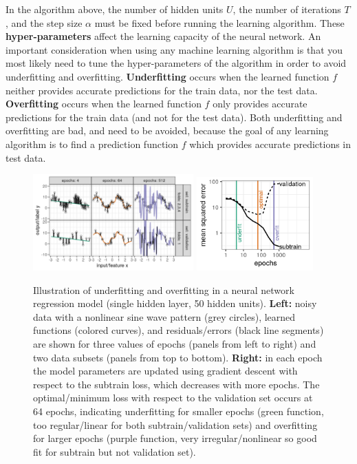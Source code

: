 \documentclass[12pt]{article}
\newcommand{\keyword}[1]{\textbf{#1}}
\begin{document}
In the algorithm above, the number of hidden units $U$, the number of
iterations $T$, and the step size $\alpha$ must be fixed before
running the learning algorithm. These \keyword{hyper-parameters}
affect the learning capacity of the neural network.  An important
consideration when using any machine learning algorithm is that you
most likely need to tune the hyper-parameters of the algorithm in
order to avoid underfitting and overfitting. \keyword{Underfitting}
occurs when the learned function $f$ neither provides accurate
predictions for the train data, nor the test
data. \keyword{Overfitting} occurs when the learned function $f$ only
provides accurate predictions for the train data (and not for the test
data). Both underfitting and overfitting are bad, and need to be
avoided, because the goal of any learning algorithm is to find a
prediction function $f$ which provides accurate predictions in test
data.

\begin{figure}
  \centering
  \includegraphics[width=0.55\textwidth]{figure-overfitting-paper}
  \includegraphics[width=0.4\textwidth]{figure-overfitting-paper-loss}   
  \caption{Illustration of underfitting and overfitting in a neural
    network regression model (single hidden layer, 50 hidden
    units). \textbf{Left:} noisy data with a nonlinear sine wave
    pattern (grey circles), learned functions (colored curves), and
    residuals/errors (black line segments) are shown for three values
    of epochs (panels from left to right) and two data subsets (panels
    from top to bottom). \textbf{Right:} in each epoch the model
    parameters are updated using gradient descent with respect to the
    subtrain loss, which decreases with more epochs. The
    optimal/minimum loss with respect to the validation set occurs at
    64 epochs, indicating underfitting for smaller epochs (green
    function, too regular/linear for both subtrain/validation sets)
    and overfitting for larger epochs (purple function, very
    irregular/nonlinear so good fit for subtrain but not validation
    set).}
  \label{fig:overfitting-paper}
\end{figure}
\end{document}
